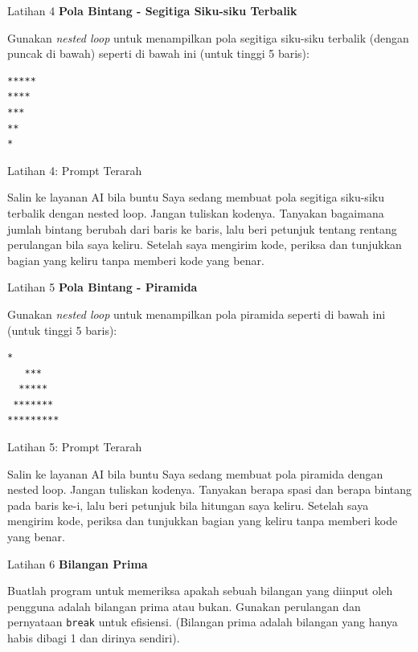 \documentclass[aspectratio=169, table]{beamer}
\begin{document}
\begin{frame}[fragile,allowframebreaks=0.8]{Latihan 4}
\footnotesize
\textbf{Pola Bintang - Segitiga Siku-siku Terbalik}\par\medskip
Gunakan \textit{nested loop} untuk menampilkan pola segitiga siku-siku terbalik (dengan puncak di bawah) seperti di bawah ini (untuk tinggi 5 baris):
\begin{lstlisting}[language=bash, breaklines=true, basicstyle=\ttfamily\scriptsize]
*****
****
***
**
*
\end{lstlisting}
\end{frame}

\begin{frame}{Latihan 4: Prompt Terarah}
\begin{block}{Salin ke layanan AI bila buntu}
\small Saya sedang membuat pola segitiga siku-siku terbalik dengan nested loop. Jangan tuliskan kodenya. Tanyakan bagaimana jumlah bintang berubah dari baris ke baris, lalu beri petunjuk tentang rentang perulangan bila saya keliru. Setelah saya mengirim kode, periksa dan tunjukkan bagian yang keliru tanpa memberi kode yang benar.
\end{block}
\end{frame}

\begin{frame}[fragile,allowframebreaks=0.8]{Latihan 5}
\footnotesize
\textbf{Pola Bintang - Piramida}\par\medskip
Gunakan \textit{nested loop} untuk menampilkan pola piramida seperti di bawah ini (untuk tinggi 5 baris):
\begin{lstlisting}[language=bash, breaklines=true, basicstyle=\ttfamily\scriptsize]
    *
   ***
  *****
 *******
*********
\end{lstlisting}
\end{frame}

\begin{frame}{Latihan 5: Prompt Terarah}
\begin{block}{Salin ke layanan AI bila buntu}
\small Saya sedang membuat pola piramida dengan nested loop. Jangan tuliskan kodenya. Tanyakan berapa spasi dan berapa bintang pada baris ke-i, lalu beri petunjuk bila hitungan saya keliru. Setelah saya mengirim kode, periksa dan tunjukkan bagian yang keliru tanpa memberi kode yang benar.
\end{block}
\end{frame}

\begin{frame}[fragile,allowframebreaks=0.8]{Latihan 6}
\footnotesize
\textbf{Bilangan Prima}\par\medskip
Buatlah program untuk memeriksa apakah sebuah bilangan yang diinput oleh pengguna adalah bilangan prima atau bukan. Gunakan perulangan dan pernyataan \texttt{break} untuk efisiensi. (Bilangan prima adalah bilangan yang hanya habis dibagi 1 dan dirinya sendiri).
\end{frame}
\end{document}
